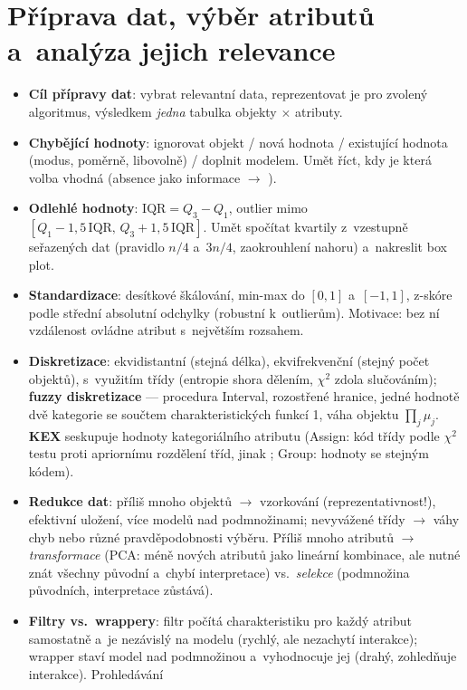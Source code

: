 \documentclass[11pt,a4paper]{article}
\theoremstyle{definition}
\begin{document}
\section{Příprava dat, výběr atributů a~analýza jejich relevance}
\begin{itemize}
\item \textbf{Cíl přípravy dat}: vybrat relevantní data, reprezentovat je pro zvolený
 algoritmus, výsledkem \emph{jedna} tabulka objekty $\times$ atributy.
\item \textbf{Chybějící hodnoty}: ignorovat objekt / nová hodnota  / existující
 hodnota (modus, poměrně, libovolně) / doplnit modelem. Umět říct, kdy je která volba
 vhodná (absence jako informace $\to$ ).
\item \textbf{Odlehlé hodnoty}: $\mathrm{IQR}=Q_3-Q_1$, outlier mimo
 $[Q_1-1{,}5\,\mathrm{IQR},\,Q_3+1{,}5\,\mathrm{IQR}]$. Umět spočítat kvartily
 z~vzestupně seřazených dat (pravidlo $n/4$ a~$3n/4$, zaokrouhlení nahoru) a~nakreslit
 box plot.
\item \textbf{Standardizace}: desítkové škálování, min-max do $[0,1]$ a~$[-1,1]$, z-skóre
 podle střední absolutní odchylky (robustní k~outlierům).
 Motivace: bez ní vzdálenost ovládne atribut s~největším rozsahem.
\item \textbf{Diskretizace}: ekvidistantní (stejná délka), ekvifrekvenční (stejný počet
 objektů), s~využitím třídy (entropie shora dělením, $\chi^2$ zdola slučováním);
 \textbf{fuzzy diskretizace} --- procedura Interval, rozostřené hranice, jedné hodnotě
 dvě kategorie se součtem charakteristických funkcí 1, váha objektu $\prod_j\mu_j$.
 \textbf{KEX} seskupuje hodnoty kategoriálního atributu (Assign: kód třídy podle
 $\chi^2$ testu proti apriornímu rozdělení tříd, jinak ; Group: hodnoty se
 stejným kódem).
\item \textbf{Redukce dat}: příliš mnoho objektů $\to$ vzorkování (reprezentativnost!),
 efektivní uložení, více modelů nad podmnožinami; nevyvážené třídy $\to$ váhy chyb nebo
 různé pravděpodobnosti výběru. Příliš mnoho atributů $\to$ \emph{transformace} (PCA:
 méně nových atributů jako lineární kombinace, ale nutné znát všechny původní a~chybí
 interpretace) vs.\ \emph{selekce} (podmnožina původních, interpretace zůstává).
\item \textbf{Filtry vs.\ wrappery}: filtr počítá charakteristiku pro každý atribut
 samostatně a~je nezávislý na modelu (rychlý, ale nezachytí interakce); wrapper staví
 model nad podmnožinou a~vyhodnocuje jej (drahý, zohledňuje interakce). Prohledávání

\end{itemize}
\end{document}
